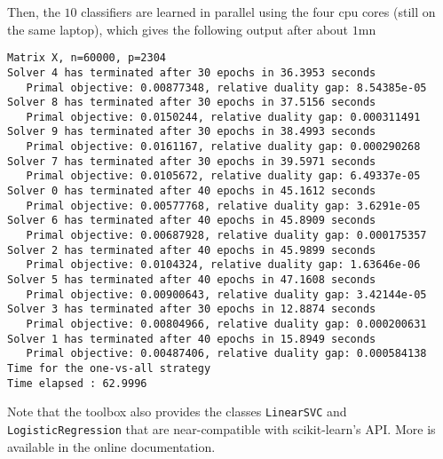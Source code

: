 \documentclass{article}
\begin{document}
Then, the $10$ classifiers are learned in parallel using the four cpu cores
(still on the same laptop), which gives the following output after about $1$mn
\begin{verbatim}
Matrix X, n=60000, p=2304
Solver 4 has terminated after 30 epochs in 36.3953 seconds
   Primal objective: 0.00877348, relative duality gap: 8.54385e-05
Solver 8 has terminated after 30 epochs in 37.5156 seconds
   Primal objective: 0.0150244, relative duality gap: 0.000311491
Solver 9 has terminated after 30 epochs in 38.4993 seconds
   Primal objective: 0.0161167, relative duality gap: 0.000290268
Solver 7 has terminated after 30 epochs in 39.5971 seconds
   Primal objective: 0.0105672, relative duality gap: 6.49337e-05
Solver 0 has terminated after 40 epochs in 45.1612 seconds
   Primal objective: 0.00577768, relative duality gap: 3.6291e-05
Solver 6 has terminated after 40 epochs in 45.8909 seconds
   Primal objective: 0.00687928, relative duality gap: 0.000175357
Solver 2 has terminated after 40 epochs in 45.9899 seconds
   Primal objective: 0.0104324, relative duality gap: 1.63646e-06
Solver 5 has terminated after 40 epochs in 47.1608 seconds
   Primal objective: 0.00900643, relative duality gap: 3.42144e-05
Solver 3 has terminated after 30 epochs in 12.8874 seconds
   Primal objective: 0.00804966, relative duality gap: 0.000200631
Solver 1 has terminated after 40 epochs in 15.8949 seconds
   Primal objective: 0.00487406, relative duality gap: 0.000584138
Time for the one-vs-all strategy
Time elapsed : 62.9996
\end{verbatim}
Note that the toolbox also provides the classes \texttt{LinearSVC} and \texttt{LogisticRegression} that are near-compatible with scikit-learn's API. More is available in the online documentation.
\end{document}
